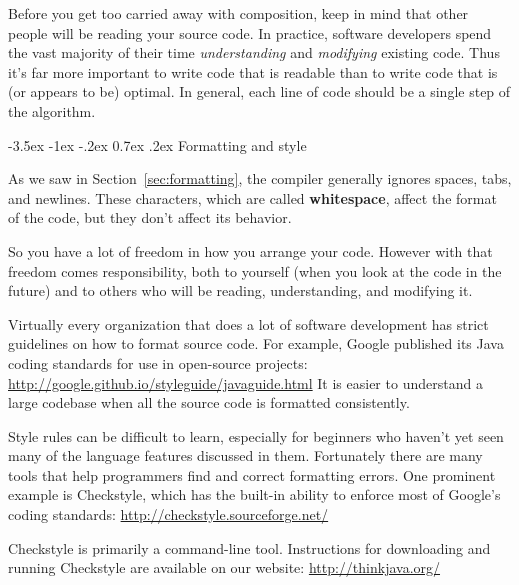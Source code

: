 \documentclass[12pt]{book}
\makeatletter
\theoremstyle{exercise}
\renewcommand{\section}{\@startsection{section}{1}{\z@}%
    {-3.5ex \@plus -1ex \@minus -.2ex}%
    {0.7ex \@plus.2ex}%
    {\normalfont\Large\bfseries}}
\makeatother
\begin{document}
Before you get too carried away with composition, keep in mind that other people will be reading your source code.
In practice, software developers spend the vast majority of their time {\em understanding} and {\em modifying} existing code.
Thus it's far more important to write code that is readable than to write code that is (or appears to be) optimal.
In general, each line of code should be a single step of the algorithm.


\section{Formatting and style}


As we saw in Section~\ref{sec:formatting}, the compiler generally ignores spaces, tabs, and newlines.
These characters, which are called {\bf whitespace}, affect the format of the code, but they don't affect its behavior.

So you have a lot of freedom in how you arrange your code.
However with that freedom comes responsibility, both to yourself (when you look at the code in the future) and to others who will be reading, understanding, and modifying it.


Virtually every organization that does a lot of software development has strict guidelines on how to format source code.
For example, Google published its Java coding standards for use in open-source projects:
\url{http://google.github.io/styleguide/javaguide.html}
It is easier to understand a large codebase when all the source code is formatted consistently.


Style rules can be difficult to learn, especially for beginners who haven't yet seen many of the language features discussed in them.
Fortunately there are many tools that help programmers find and correct formatting errors.
One prominent example is Checkstyle, which has the built-in ability to enforce most of Google's coding standards:
\url{http://checkstyle.sourceforge.net/}

Checkstyle is primarily a command-line tool.
Instructions for downloading and running Checkstyle are available on our website: \url{http://thinkjava.org/}

\end{document}
